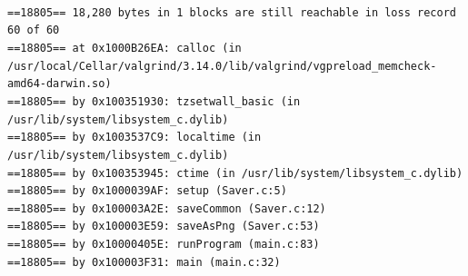 \documentclass{mwart}
\begin{document}
\begin{scriptsize}
\noindent \texttt{\noindent 
\\==18805== 18,280 bytes in 1 blocks are still reachable in loss record 60 of 60
\\==18805==    at 0x1000B26EA: calloc (in /usr/local/Cellar/valgrind/3.14.0/lib/valgrind/vgpreload\_memcheck-amd64-darwin.so)
\\==18805==    by 0x100351930: tzsetwall\_basic (in /usr/lib/system/libsystem\_c.dylib)
\\==18805==    by 0x1003537C9: localtime (in /usr/lib/system/libsystem\_c.dylib)
\\==18805==    by 0x100353945: ctime (in /usr/lib/system/libsystem\_c.dylib)
\\==18805==    by 0x1000039AF: setup (Saver.c:5)
\\==18805==    by 0x100003A2E: saveCommon (Saver.c:12)
\\==18805==    by 0x100003E59: saveAsPng (Saver.c:53)
\\==18805==    by 0x10000405E: runProgram (main.c:83)
\\==18805==    by 0x100003F31: main (main.c:32)
}
\end{scriptsize}




\end{document}
